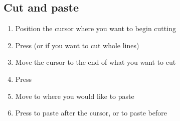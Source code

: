 \documentclass[a4paper,10pt,landscape]{article}
\begin{document}
\begin{multicols}{3}
\section{Cut and paste}
\begin{enumerate}
    \item Position the cursor where you want to begin cutting
    \item Press  (or  if you want to cut whole lines)
    \item Move the cursor to the end of what you want to cut
    \item Press 
    \item Move to where you would like to paste
    \item Press  to paste after the cursor, or  to paste before
\end{enumerate}

\end{multicols}
\end{document}
